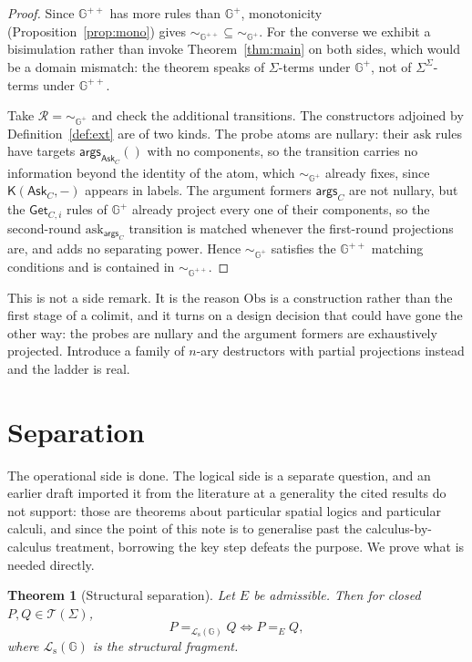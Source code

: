 \documentclass[11pt]{article}
\theoremstyle{plain}
\newtheorem{theorem}{Theorem}
\theoremstyle{definition}
\newcommand{\Kc}{\mathsf{K}}
\newcommand{\Gg}{\mathbb{G}}
\newcommand{\Lo}{\mathcal{L}}
\newcommand{\Obs}{\mathrm{Obs}}
\newcommand{\Ask}{\mathsf{Ask}}
\newcommand{\Get}{\mathsf{Get}}
\newcommand{\args}{\mathsf{args}}
\newcommand{\bis}{\sim}
\newcommand{\Terms}{\mathcal{T}}
\begin{document}
\begin{proof}
Since $\Gg^{++}$ has more rules than $\Gg^+$, monotonicity (Proposition~\ref{prop:mono}) gives
$\bis_{\Gg^{++}} \subseteq \bis_{\Gg^+}$. For the converse we exhibit a bisimulation rather than
invoke Theorem~\ref{thm:main} on both sides, which would be a domain mismatch: the theorem speaks of
$\Sigma$-terms under $\Gg^+$, not of $\Sigma^\Sigma$-terms under $\Gg^{++}$.

Take $\mathcal{R} = \bis_{\Gg^+}$ and check the additional transitions. The constructors adjoined by
Definition~\ref{def:ext} are of two kinds. The probe atoms are nullary: their $\mathrm{ask}$ rules have
targets $\args_{\Ask_C}()$ with no components, so the transition carries no information beyond the
identity of the atom, which $\bis_{\Gg^+}$ already fixes, since $\Kc(\Ask_C,-)$ appears in labels. The
argument formers $\args_C$ are not nullary, but the $\Get_{C,i}$ rules of $\Gg^+$ already project every
one of their components, so the second-round $\mathrm{ask}_{\args_C}$ transition is matched whenever
the first-round projections are, and adds no separating power. Hence $\bis_{\Gg^+}$ satisfies the
$\Gg^{++}$ matching conditions and is contained in $\bis_{\Gg^{++}}$.
\end{proof}

This is not a side remark. It is the reason $\Obs$ is a construction rather than the first stage of a
colimit, and it turns on a design decision that could have gone the other way: the probes are nullary
and the argument formers are exhaustively projected. Introduce a family of $n$-ary destructors with
partial projections instead and the ladder is real.

\section{Separation}
\label{sec:separation}

The operational side is done. The logical side is a separate question, and an earlier draft imported it
from the literature at a generality the cited results do not support: those are theorems about
particular spatial logics and particular calculi, and since the point of this note is to generalise
past the calculus-by-calculus treatment, borrowing the key step defeats the purpose. We prove what is
needed directly.

\begin{theorem}[Structural separation]
\label{thm:sep}
Let $E$ be admissible. Then for closed $P,Q \in \Terms(\Sigma)$,
\[
P =_{\Lo_{\mathrm{s}}(\Gg)} Q \iff P =_E Q ,
\]
where $\Lo_{\mathrm{s}}(\Gg)$ is the structural fragment.
\end{theorem}
\end{document}
